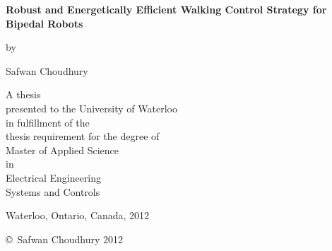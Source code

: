 \pagestyle{empty}


\begin{titlepage}
    \begin{center}
        \vspace*{1.0cm}

        \Huge
        {\bf Robust and Energetically Efficient Walking Control Strategy for \\ Bipedal Robots }

        \vspace*{1.0cm}

        \normalsize
        by \\

        \vspace*{1.0cm}

        \Large
        Safwan Choudhury \\

        \vspace*{3.0cm}

        \normalsize
        A thesis \\
        presented to the University of Waterloo \\ 
        in fulfillment of the \\
        thesis requirement for the degree of \\
        Master of Applied Science \\
        in \\
        Electrical Engineering\\
 		Systems and Controls \\

        \vspace*{2.0cm}

        Waterloo, Ontario, Canada, 2012 \\

        \vspace*{1.0cm}

        \copyright\ Safwan Choudhury 2012 \\
    \end{center}
\end{titlepage}

\pagestyle{plain}
\setcounter{page}{2}

\cleardoublepage


